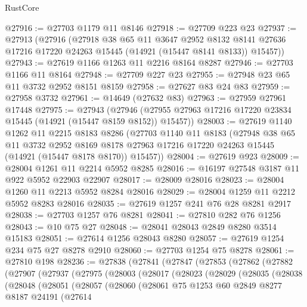 \begin{lexlean}{RustCore}
\begin{coremodule}
@27916 := @27703 @1179 @11 @8146
@27918 := @27709 @223 @23
@27937 := @27913
    (@27916
      (@27918
        @38
        @65
        @11
        @3647
        @2952
        @8132
        @8141
        @27636
        @17216
        @17220
        @24263
        @15445
        (@14921 (@15447 @8141 @8133))
        @15457))
@27943 := @27619 @1166 @1263 @11 @2216 @8164 @8287
@27946 := @27703 @1166 @11 @8164
@27948 := @27709 @227 @23
@27955 := @27948 @23 @65 @11 @3732 @2952 @8151 @8159
@27958 := @27627 @83 @24 @83
@27959 := @27958 @3732
@27961 := @14649 (@27632 @83)
@27963 := @27959 @27961 @17448
@27975 := @27943
    (@27946 (@27955 @27963 @17216 @17220 @23834 @15445 (@14921 (@15447 @8159 @8152)) @15457))
@28003 := @27619
    @1140
    @1262
    @11
    @2215
    @8183
    @8286
    (@27703
      @1140
      @11
      @8183
      (@27948
        @38
        @65
        @11
        @3732
        @2952
        @8169
        @8178
        @27963
        @17216
        @17220
        @24263
        @15445
        (@14921 (@15447 @8178 @8170))
        @15457))
@28004 := @27619 @923
@28009 := @28004 @1261 @11 @2214 @5952 @8285
@28016 := @16197 @27548 @3187 @11 @922 @5952 @22903 @22907
@28017 := @28009 @28016
@28023 := @28004 @1260 @11 @2213 @5952 @8284 @28016
@28029 := @28004 @1259 @11 @2212 @5952 @8283 @28016
@28035 := @27619 @1257 @241 @76 @28 @8281 @2917
@28038 := @27703 @1257 @76 @8281
@28041 := @27810 @282 @76 @1256
@28043 := @10 @75 @27
@28048 := @28041 @28043 @2849 @8280 @3514 @15183
@28051 := @27614 @1256 @28043 @8280
@28057 := @27619 @1254 @234 @75 @27 @8278 @2910
@28060 := @27703 @1254 @75 @8278
@28061 := @27810 @198
@28236 := @27838
    (@27841
      (@27847
        (@27853
          (@27862
            (@27882
              (@27907
                (@27937
                  (@27975
                    (@28003
                      (@28017
                        (@28023
                          (@28029
                            (@28035
                              (@28038
                                (@28048
                                  (@28051
                                    (@28057
                                      (@28060
                                        (@28061
                                          @75
                                          @1253
                                          @60
                                          @2849
                                          @8277
                                          @8187
                                          @24191
                                          (@27614

\end{coremodule}
\end{lexlean}
